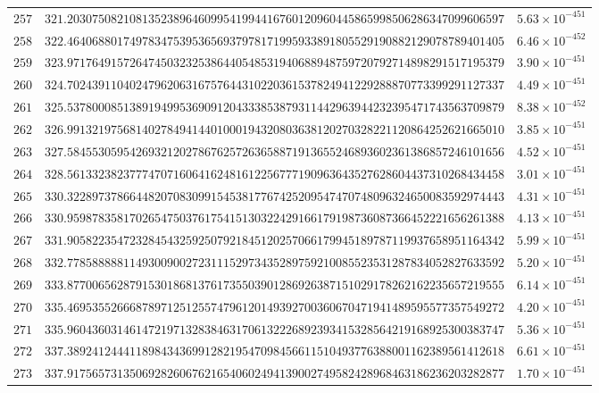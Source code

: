 \documentclass[12pt,reqno]{amsart}
\theoremstyle{remark}
\begin{document}
\begin{longtable}{clc}
$257$ & $321.2030750821081352389646099541994416760120960445865998506286347099606597$ & $5.63\times 10^{-451}$ \\
$258$ & $322.4640688017497834753953656937978171995933891805529190882129078789401405$ & $6.46\times 10^{-452}$ \\
$259$ & $323.9717649157264745032325386440548531940688948759720792714898291517195379$ & $3.90\times 10^{-451}$ \\
$260$ & $324.7024391104024796206316757644310220361537824941229288870773399291127337$ & $4.49\times 10^{-451}$ \\
$261$ & $325.5378000851389194995369091204333853879311442963944232395471743563709879$ & $8.38\times 10^{-452}$ \\
$262$ & $326.9913219756814027849414401000194320803638120270328221120864252621665010$ & $3.85\times 10^{-451}$ \\
$263$ & $327.5845530595426932120278676257263658871913655246893602361386857246101656$ & $4.52\times 10^{-451}$ \\
$264$ & $328.5613323823777470716064162481612256777190963643527628604437310268434458$ & $3.01\times 10^{-451}$ \\
$265$ & $330.3228973786644820708309915453817767425209547470748096324650083592974443$ & $4.31\times 10^{-451}$ \\
$266$ & $330.9598783581702654750376175415130322429166179198736087366452221656261388$ & $4.13\times 10^{-451}$ \\
$267$ & $331.9058223547232845432592507921845120257066179945189787119937658951164342$ & $5.99\times 10^{-451}$ \\
$268$ & $332.7785888881149300900272311152973435289759210085523531287834052827633592$ & $5.20\times 10^{-451}$ \\
$269$ & $333.8770065628791530186813761735503901286926387151029178262162235657219555$ & $6.14\times 10^{-451}$ \\
$270$ & $335.4695355266687897125125574796120149392700360670471941489595577357549272$ & $4.20\times 10^{-451}$ \\
$271$ & $335.9604360314614721971328384631706132226892393415328564219168925300383747$ & $5.36\times 10^{-451}$ \\
$272$ & $337.3892412444118984343699128219547098456611510493776388001162389561412618$ & $6.61\times 10^{-451}$ \\
$273$ & $337.9175657313506928260676216540602494139002749582428968463186236203282877$ & $1.70\times 10^{-451}$ \\

\end{longtable}
\end{document}

